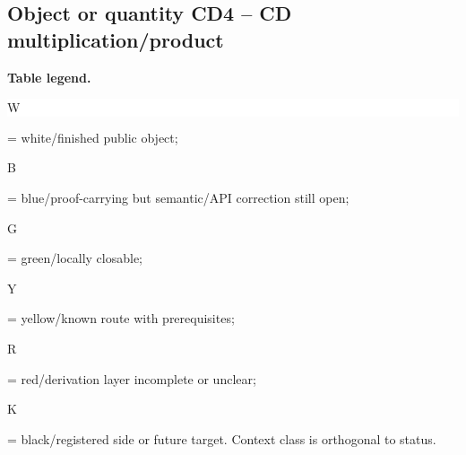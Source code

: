 \subsection*{Object or quantity CD4 -- CD multiplication/\allowbreak{}product}
\hypertarget{objproof:CD4}{}
\par\smallskip\noindent\begin{minipage}{0.99\linewidth}\footnotesize\raggedright\textbf{Table legend.} \colorbox{white}{\strut W} = white/finished public object; \colorbox{cyan!20}{\strut B} = blue/proof-carrying but semantic/API correction still open; \colorbox{green!18}{\strut G} = green/locally closable; \colorbox{yellow!25}{\strut Y} = yellow/known route with prerequisites; \colorbox{red!20}{\strut R} = red/derivation layer incomplete or unclear; \colorbox{black!18}{\strut K} = black/registered side or future target. Context class is orthogonal to status.\end{minipage}\par\vspace{0.25em}
